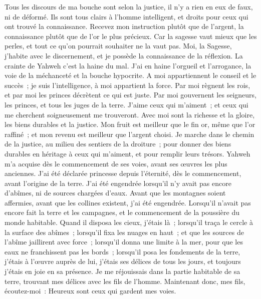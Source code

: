 \begin{multicols}{2}
Tous les discours de ma bouche sont selon la justice, il n'y a rien en eux de faux, ni de déformé.
Ils sont tous clairs à l'homme intelligent, et droits pour ceux qui ont trouvé la connaissance.
Recevez mon instruction plutôt que de l'argent, la connaissance plutôt que de l'or le plus précieux.
Car la sagesse vaut mieux que les perles, et tout ce qu'on pourrait souhaiter ne la vaut pas.
Moi, la Sagesse, j'habite avec le discernement, et je possède la connaissance de la réflexion.
La crainte de Yahweh c'est la haine du mal. J'ai en haine l'orgueil et l'arrogance, la voie de la méchanceté et la bouche hypocrite.
A moi appartiennent le conseil et le succès~; je suis l'intelligence, à moi appartient la force.
Par moi règnent les rois, et par moi les princes décrètent ce qui est juste.
Par moi gouvernent les seigneurs, les princes, et tous les juges de la terre.
J'aime ceux qui m'aiment~; et ceux qui me cherchent soigneusement me trouveront.
Avec moi sont la richesse et la gloire, les biens durables et la justice.
Mon fruit est meilleur que le fin or, même que l'or raffiné~; et mon revenu est meilleur que l'argent choisi.
Je marche dans le chemin de la justice, au milieu des sentiers de la droiture~;
pour donner des biens durables en héritage à ceux qui m'aiment, et pour remplir leurs trésors.
Yahweh m'a acquise dès le commencement de ses voies, avant ses œuvres les plus anciennes.
J'ai été déclarée princesse depuis l'éternité, dès le commencement, avant l'origine de la terre.
J'ai été engendrée lorsqu'il n'y avait pas encore d'abîmes, ni de sources chargées d'eaux.
Avant que les montagnes soient affermies, avant que les collines existent, j'ai été engendrée.
Lorsqu'il n'avait pas encore fait la terre et les campagnes, et le commencement de la poussière du monde habitable.
Quand il disposa les cieux, j'étais là~; lorsqu'il traça le cercle à la surface des abîmes~;
lorsqu'il fixa les nuages en haut~; et que les sources de l'abîme jaillirent avec force~;
lorsqu'il donna une limite à la mer, pour que les eaux ne franchissent pas les bords~; lorsqu'il posa les fondements de la terre,
j'étais à l'œuvre auprès de lui, j'étais ses délices de tous les jours, et toujours j'étais en joie en sa présence.
Je me réjouissais dans la partie habitable de sa terre, trouvant mes délices avec les fils de l'homme.
Maintenant donc, mes fils, écoutez-moi~: Heureux sont ceux qui gardent mes voies.

\end{multicols}
